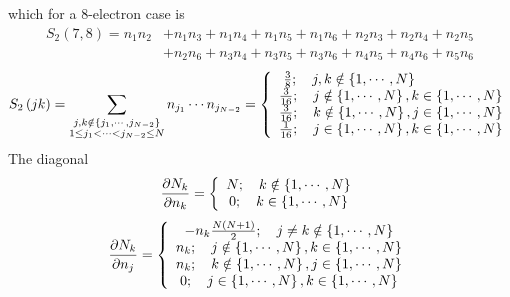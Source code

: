 \documentclass[aps,preprint]{revtex4}%
\begin{document}
which for a $8$-electron case is
\begin{align}
S_{2}\left(  7,8\right)  =n_{1}n_{2}  &  +n_{1}n_{3}+n_{1}n_{4}+n_{1}%
n_{5}+n_{1}n_{6}+n_{2}n_{3}+n_{2}n_{4}+n_{2}n_{5}\\
&  +n_{2}n_{6}+n_{3}n_{4}+n_{3}n_{5}+n_{3}n_{6}+n_{4}n_{5}+n_{4}n_{6}%
+n_{5}n_{6}%
\end{align}%
\begin{equation}
S_{2}\left(  jk\right)  =\sum_{\substack{j,k\notin\left\{  j_{1}%
,\cdots,j_{N-2}\right\}  \\1\leq j_{1}<\cdots<j_{N-2}\leq N}}n_{j_{1}}\cdots
n_{j_{N-2}}=\left\{
\begin{array}
[c]{c}%
\frac{3}{8};\quad j,k\notin\left\{  1,\cdots,N\right\}  \qquad\qquad\qquad\\
\frac{3}{16};\quad j\notin\left\{  1,\cdots,N\right\}  ,k\in\left\{
1,\cdots,N\right\} \\
\frac{3}{16};\quad k\notin\left\{  1,\cdots,N\right\}  ,j\in\left\{
1,\cdots,N\right\} \\
\frac{1}{16};\quad j\in\left\{  1,\cdots,N\right\}  ,k\in\left\{
1,\cdots,N\right\}
\end{array}
\right.
\end{equation}
The diagonal
\begin{equation}
\frac{\partial N_{k}}{\partial n_{k}}=\left\{
\begin{array}
[c]{c}%
N;\quad k\notin\left\{  1,\cdots,N\right\} \\
0;\quad k\in\left\{  1,\cdots,N\right\}
\end{array}
\right.
\end{equation}%
\begin{equation}
\frac{\partial N_{k}}{\partial n_{j}}=\left\{
\begin{array}
[c]{c}%
-n_{k}\frac{N\left(  N+1\right)  }{2};\quad j\neq k\notin\left\{
1,\cdots,N\right\} \\
n_{k};\quad j\notin\left\{  1,\cdots,N\right\}  ,k\in\left\{  1,\cdots
,N\right\} \\
n_{k};\quad k\notin\left\{  1,\cdots,N\right\}  ,j\in\left\{  1,\cdots
,N\right\} \\
0;\quad j\in\left\{  1,\cdots,N\right\}  ,k\in\left\{  1,\cdots,N\right\}
\end{array}
\right.
\end{equation}
\end{document}
